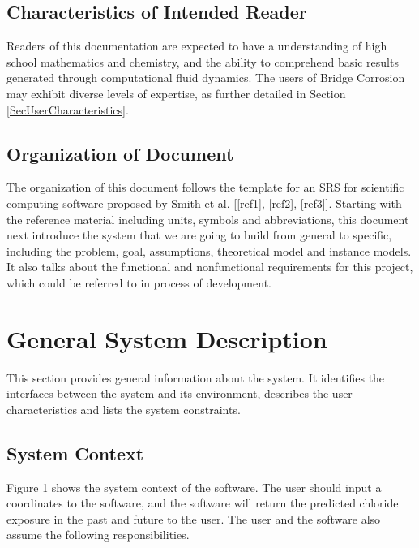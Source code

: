 \documentclass[12pt]{article}
\newcommand{\reref}[1]{\ref{#1}}
\begin{document}
\subsection{Characteristics of Intended Reader} \label{sec_IntendedReader}
Readers of this documentation are expected to have a understanding of high school mathematics and chemistry, and the ability to comprehend basic results generated through computational fluid dynamics. The users of Bridge Corrosion may exhibit diverse levels of expertise, as further detailed in Section \ref{SecUserCharacteristics}.

\subsection{Organization of Document}
The organization of this document follows the template for an SRS for scientific computing software proposed by Smith et al. [\reref{ref1}, \reref{ref2}, \reref{ref3}]. Starting with the reference material including units, symbols and abbreviations, this document next introduce the system that we are going to build from general to specific, including the problem, goal, assumptions, theoretical model and instance models. It also talks about the functional and nonfunctional requirements for this project, which could be referred to in process of development.

\section{General System Description}

This section provides general information about the system.  It identifies the
interfaces between the system and its environment, describes the user
characteristics and lists the system constraints.  
\subsection{System Context}
Figure 1 shows the system context of the software. The user should input a coordinates to the software, and the software will return the predicted chloride exposure in the past and future to the user. The user and the software also assume the following responsibilities.
\end{document}
